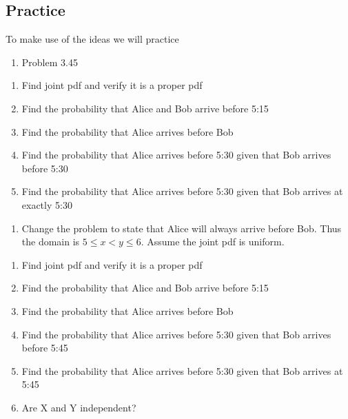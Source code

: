 \documentclass[]{book}
\providecommand{\tightlist}{%
  \setlength{\itemsep}{0pt}\setlength{\parskip}{0pt}}
\theoremstyle{definition}
\theoremstyle{definition}
\theoremstyle{definition}
\theoremstyle{remark}
\begin{document}
\subsection{Practice}\label{practice-5}

To make use of the ideas we will practice

\begin{enumerate}
\def\labelenumi{\arabic{enumi}.}
\tightlist
\item
  Problem 3.45\\
\end{enumerate}

\begin{enumerate}
\def\labelenumi{\alph{enumi}.}
\tightlist
\item
  Find joint pdf and verify it is a proper pdf\\
\item
  Find the probability that Alice and Bob arrive before 5:15\\
\item
  Find the probability that Alice arrives before Bob\\
\item
  Find the probability that Alice arrives before 5:30 given that Bob
  arrives before 5:30\\
\item
  Find the probability that Alice arrives before 5:30 given that Bob
  arrives at exactly 5:30
\end{enumerate}

\begin{enumerate}
\def\labelenumi{\arabic{enumi}.}
\setcounter{enumi}{1}
\tightlist
\item
  Change the problem to state that Alice will always arrive before Bob.
  Thus the domain is \(5 \leq x < y \leq 6\). Assume the joint pdf is
  uniform.
\end{enumerate}

\begin{enumerate}
\def\labelenumi{\alph{enumi}.}
\tightlist
\item
  Find joint pdf and verify it is a proper pdf\\
\item
  Find the probability that Alice and Bob arrive before 5:15\\
\item
  Find the probability that Alice arrives before Bob\\
\item
  Find the probability that Alice arrives before 5:30 given that Bob
  arrives before 5:45\\
\item
  Find the probability that Alice arrives before 5:30 given that Bob
  arrives at 5:45\\
\item
  Are X and Y independent?
\end{enumerate}
\end{document}
